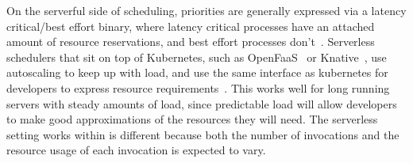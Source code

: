 On the serverful side of scheduling, priorities are generally expressed via a
latency critical/best effort binary, where latency critical processes have an
attached amount of resource reservations, and best effort processes
don't~\cite{kubernetes-lc-be}. Serverless schedulers that sit on top of
Kubernetes, such as OpenFaaS~\cite{openfaas} or Knative~\cite{knative}, use
autoscaling to keep up with load, and use the same interface as kubernetes for
developers to express resource requirements~\cite{knative-res, openfaas-res}.
This works well for long running servers with steady amounts of load, since
predictable load will allow developers to make good approximations of the
resources they will need. The serverless setting \sys{} works within is
different because both the number of invocations and the resource usage of each
invocation is expected to vary. 
